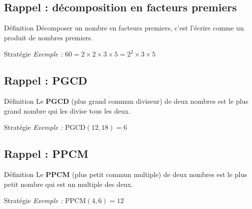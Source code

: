 \newpage
\semaineinvisible
{} 

\vfill
\subsection{Rappel : décomposition en facteurs premiers}

\begin{regle}{Définition}
Décomposer un nombre en facteurs premiers, c'est l'écrire comme un produit de nombres premiers.
\end{regle}

\vspace{6pt}
\begin{astuce}{Stratégie}
\textit{Exemple :} $60 = 2 \times 2 \times 3 \times 5 = 2^2 \times 3 \times 5$
\end{astuce}

\vspace{10pt}
\subsection{Rappel : PGCD}

\begin{regle}{Définition}
Le \textbf{PGCD} (plus grand commun diviseur) de deux nombres est le plus grand nombre qui les divise tous les deux.
\end{regle}

\vspace{6pt}
\begin{astuce}{Stratégie}
\textit{Exemple :} $\text{PGCD}(12, 18) = 6$
\end{astuce}

\vspace{10pt}
\subsection{Rappel : PPCM}

\begin{regle}{Définition}
Le \textbf{PPCM} (plus petit commun multiple) de deux nombres est le plus petit nombre qui est un multiple des deux.
\end{regle}

\vspace{6pt}
\begin{astuce}{Stratégie}
\textit{Exemple :} $\text{PPCM}(4, 6) = 12$
\end{astuce}